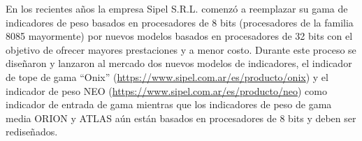 \documentclass[11pt]{charter}
\begin{document}
%
%
%
%
%
%
%

En los recientes años la empresa Sipel S.R.L. comenzó a reemplazar su gama de indicadores de peso basados en procesadores de 8 bits (procesadores de la familia 8085 mayormente) por nuevos modelos basados en procesadores de 32 bits con el objetivo de ofrecer mayores prestaciones y a menor costo. Durante este proceso se diseñaron y lanzaron al mercado dos nuevos modelos de indicadores, el indicador de tope de gama “Onix” (\url{https://www.sipel.com.ar/es/producto/onix}) y el indicador de peso NEO (\url{https://www.sipel.com.ar/es/producto/neo}) como indicador de entrada de gama mientras que los indicadores de peso de gama media ORION y ATLAS  aún están basados en procesadores de 8 bits y deben ser rediseñados.\\
\end{document}
